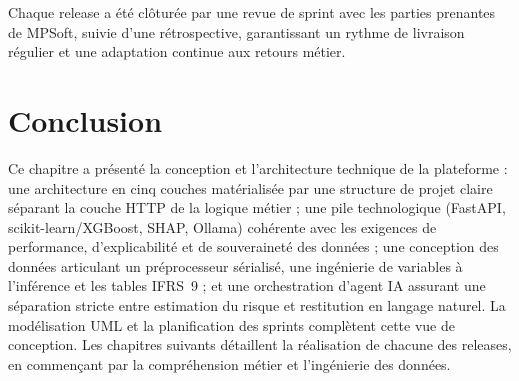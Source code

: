 Chaque release a été clôturée par une revue de sprint avec les parties prenantes de
MPSoft, suivie d'une rétrospective, garantissant un rythme de livraison régulier et
une adaptation continue aux retours métier.

\section*{Conclusion}

Ce chapitre a présenté la conception et l'architecture technique de la plateforme :
une architecture en cinq couches matérialisée par une structure de projet claire
séparant la couche HTTP de la logique métier ; une pile technologique (FastAPI,
scikit-learn/XGBoost, SHAP, Ollama) cohérente avec les exigences de performance,
d'explicabilité et de souveraineté des données ; une conception des données
articulant un préprocesseur sérialisé, une ingénierie de variables à l'inférence et
les tables IFRS~9 ; et une orchestration d'agent IA assurant une séparation stricte
entre estimation du risque et restitution en langage naturel. La modélisation UML et
la planification des sprints complètent cette vue de conception. Les chapitres
suivants détaillent la réalisation de chacune des releases, en commençant par la
compréhension métier et l'ingénierie des données.


